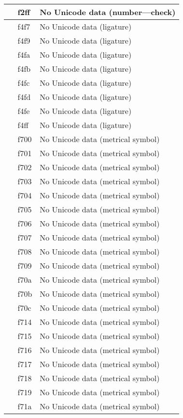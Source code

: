 \documentclass[12pt,letterpaper,openany]{book}
\begin{document}
\begin{center}
\begin{supertabular}{|m{0.25in}|m{0.5in}|m{4in}|}
 & f2ff & No Unicode data (number---check)\\\hline
 & f4f7 & No Unicode data (ligature)\\\hline
 & f4f9 & No Unicode data (ligature)\\\hline
 & f4fa & No Unicode data (ligature)\\\hline
 & f4fb & No Unicode data (ligature)\\\hline
 & f4fc & No Unicode data (ligature)\\\hline
 & f4fd & No Unicode data (ligature)\\\hline
 & f4fe & No Unicode data (ligature)\\\hline
 & f4ff & No Unicode data (ligature)\\\hline
 & f700 & No Unicode data (metrical symbol)\\\hline
 & f701 & No Unicode data (metrical symbol)\\\hline
 & f702 & No Unicode data (metrical symbol)\\\hline
 & f703 & No Unicode data (metrical symbol)\\\hline
 & f704 & No Unicode data (metrical symbol)\\\hline
 & f705 & No Unicode data (metrical symbol)\\\hline
 & f706 & No Unicode data (metrical symbol)\\\hline
 & f707 & No Unicode data (metrical symbol)\\\hline
 & f708 & No Unicode data (metrical symbol)\\\hline
 & f709 & No Unicode data (metrical symbol)\\\hline
 & f70a & No Unicode data (metrical symbol)\\\hline
 & f70b & No Unicode data (metrical symbol)\\\hline
 & f70c & No Unicode data (metrical symbol)\\\hline
 & f714 & No Unicode data (metrical symbol)\\\hline
 & f715 & No Unicode data (metrical symbol)\\\hline
 & f716 & No Unicode data (metrical symbol)\\\hline
 & f717 & No Unicode data (metrical symbol)\\\hline
 & f718 & No Unicode data (metrical symbol)\\\hline
 & f719 & No Unicode data (metrical symbol)\\\hline
 & f71a & No Unicode data (metrical symbol)\\\hline

\end{supertabular}
\end{center}
\end{document}
